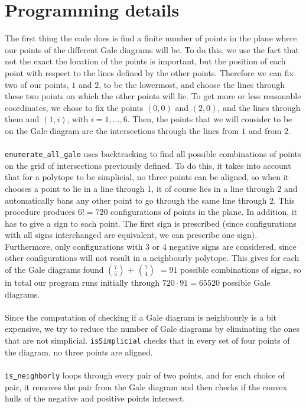 \documentclass[paper=a4, fontsize=11pt]{scrartcl} %
\theoremstyle{definition}
\begin{document}
\section{Programming details}
The first thing the code does is find a finite number of points in the plane where our points of the different Gale diagrams will be. To do this, we use the fact that not the exact the location of the points is important, but the position of each point with respect to the lines defined by the other points. Therefore we can fix two of our points, $1$ and $2$, to be the lowermost, and choose the lines through these two points on which the other points will lie. To get more or less reasonable coordinates, we chose to fix the points $(0,0)$ and $(2,0)$, and the lines through them and $(1,i)$, with $i =1,\ldots,6$. Then, the points that we will consider to be on the Gale diagram are the intersections through the lines from $1$ and from $2$.\\
\\
\texttt{enumerate\underline{ }all\underline{ }gale} uses backtracking to find all possible combinations of  points on the grid of intersections previously defined. To do this, it takes into account that for a polytope to be simplicial, no three points can be aligned, so when it chooses a point to lie in a line through 1, it of course lies in a line through 2 and automatically bans any other point to go through the same line through 2. This procedure produces $6! = 720$ configurations of points in the plane. In addition, it has to give a sign to each point. The first sign is prescribed (since configurations with all signs interchanged are equivalent, we can prescribe one sign). Furthermore, only configurations with $3$ or $4$ negative signs are considered, since other configurations will not result in a neighbourly polytope. This gives for each of the Gale diagrams found $7\choose 5$ $+$ $7\choose 4$ $= 91$ possible combinations of signs, so in total our program runs initially through $720\cdot 91 = 65520$ possible Gale diagrams.\\
\\
Since the computation of checking if a Gale diagram is neighbourly is a bit expensive, we try to reduce the number of Gale diagrams by eliminating the ones that are not simplicial. \texttt{isSimplicial} checks that in every set of four points of the diagram, no three points are aligned.\\
\\
\texttt{is\underline{ }neighborly} loops through every pair of two points, and for each choice of pair, it removes the pair from the Gale diagram and then checks if the convex hulls of the negative and positive points intersect.\\
\end{document}
